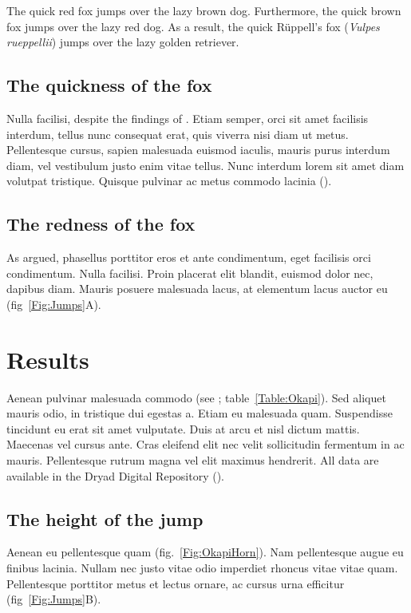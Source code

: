 \documentclass[11pt]{article}
\begin{document}
The quick red fox jumps over the lazy brown dog. Furthermore, the quick 
brown fox jumps over the lazy red dog. As a result, the quick 
R\"{u}ppell's fox (\textit{Vulpes rueppellii}) jumps over the lazy 
golden retriever.

\subsection*{The quickness of the fox}

Nulla facilisi, despite the findings of \citet{LemKapEx07}. Etiam 
semper, orci sit amet facilisis interdum, tellus nunc consequat erat, 
quis viverra nisi diam ut metus. Pellentesque cursus, sapien malesuada 
euismod iaculis, mauris purus interdum diam, vel vestibulum justo enim 
vitae tellus. Nunc interdum lorem sit amet diam volutpat tristique. 
Quisque pulvinar ac metus commodo lacinia (\citealt{Ing11,Xiao2015}).  

\subsection*{The redness of the fox}

As \citet{Xiao2015} argued, phasellus porttitor eros et ante 
condimentum, eget facilisis orci condimentum. Nulla facilisi. Proin 
placerat elit blandit, euismod dolor nec, dapibus diam. Mauris posuere 
malesuada lacus, at elementum lacus auctor eu (fig~\ref{Fig:Jumps}A). 

\section*{Results}

Aenean pulvinar malesuada commodo (see \citealt{DavisEtAl2011}; 
table~\ref{Table:Okapi}). Sed aliquet mauris odio, in tristique dui 
egestas a. Etiam eu malesuada quam. Suspendisse tincidunt eu erat sit 
amet vulputate. Duis at arcu et nisl dictum mattis. Maecenas vel cursus 
ante. Cras eleifend elit nec velit sollicitudin fermentum in ac mauris. 
Pellentesque rutrum magna vel elit maximus hendrerit. All data are 
available in the Dryad Digital Repository (\citealt{CookEtAl2015}).

\subsection*{The height of the jump}

Aenean eu pellentesque quam (fig.~\ref{Fig:OkapiHorn}). Nam pellentesque 
augue eu finibus lacinia. Nullam nec justo vitae odio imperdiet rhoncus 
vitae vitae quam. Pellentesque porttitor metus et lectus ornare, ac 
cursus urna efficitur (fig~\ref{Fig:Jumps}B). 
\end{document}
